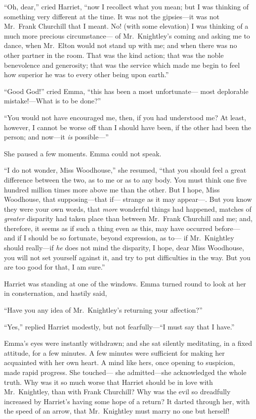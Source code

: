 ``Oh, dear,'' cried Harriet, ``now I recollect what you mean; but I
was thinking of something very different at the time.  It was not
the gipsies---it was not Mr.\ Frank Churchill that I meant.  No! (with
some elevation) I was thinking of a much more precious circumstance---%
of Mr.\ Knightley's coming and asking me to dance, when Mr.\ Elton
would not stand up with me; and when there was no other partner in
the room.  That was the kind action; that was the noble benevolence
and generosity; that was the service which made me begin to feel
how superior he was to every other being upon earth.''

``Good God!'' cried Emma, ``this has been a most unfortunate---%
most deplorable mistake!---What is to be done?''

``You would not have encouraged me, then, if you had understood me?
At least, however, I cannot be worse off than I should have been,
if the other had been the person; and now---it \emph{is} possible---''

She paused a few moments.  Emma could not speak.

``I do not wonder, Miss Woodhouse,'' she resumed, ``that you should feel
a great difference between the two, as to me or as to any body.
You must think one five hundred million times more above me than
the other.  But I hope, Miss Woodhouse, that supposing---that if---%
strange as it may appear---.  But you know they were your own words,
that \emph{more} wonderful things had happened, matches of \emph{greater} disparity
had taken place than between Mr.\ Frank Churchill and me; and, therefore,
it seems as if such a thing even as this, may have occurred before---%
and if I should be so fortunate, beyond expression, as to---%
if Mr.\ Knightley should really---if \emph{he} does not mind the disparity,
I hope, dear Miss Woodhouse, you will not set yourself against it,
and try to put difficulties in the way.  But you are too good for that,
I am sure.''

Harriet was standing at one of the windows.  Emma turned round
to look at her in consternation, and hastily said,

``Have you any idea of Mr.\ Knightley's returning your affection?''

``Yes,'' replied Harriet modestly, but not fearfully---``I must say
that I have.''

Emma's eyes were instantly withdrawn; and she sat silently meditating,
in a fixed attitude, for a few minutes.  A few minutes were sufficient
for making her acquainted with her own heart.  A mind like hers,
once opening to suspicion, made rapid progress.  She touched---%
she admitted---she acknowledged the whole truth.  Why was it
so much worse that Harriet should be in love with Mr.\ Knightley,
than with Frank Churchill?  Why was the evil so dreadfully increased
by Harriet's having some hope of a return?  It darted through her,
with the speed of an arrow, that Mr.\ Knightley must marry no one
but herself!

